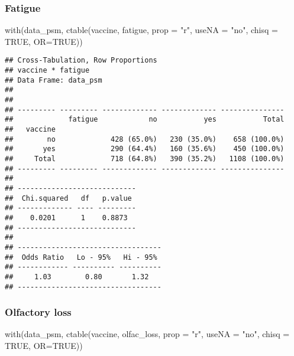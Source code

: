 \documentclass[
]{article}
\newenvironment{Shaded}{\begin{snugshade}}{\end{snugshade}}
\newcommand{\AttributeTok}[1]{\textcolor[rgb]{0.77,0.63,0.00}{#1}}
\newcommand{\ConstantTok}[1]{\textcolor[rgb]{0.00,0.00,0.00}{#1}}
\newcommand{\FunctionTok}[1]{\textcolor[rgb]{0.00,0.00,0.00}{#1}}
\newcommand{\NormalTok}[1]{#1}
\newcommand{\StringTok}[1]{\textcolor[rgb]{0.31,0.60,0.02}{#1}}
\begin{document}
\hypertarget{fatigue-1}{%
\subsubsection{Fatigue}\label{fatigue-1}}

\begin{Shaded}
\begin{Highlighting}[]
\FunctionTok{with}\NormalTok{(data\_psm, }\FunctionTok{ctable}\NormalTok{(vaccine, fatigue, }\AttributeTok{prop =} \StringTok{"r"}\NormalTok{, }\AttributeTok{useNA =} \StringTok{"no"}\NormalTok{, }\AttributeTok{chisq =} \ConstantTok{TRUE}\NormalTok{, }\AttributeTok{OR=}\ConstantTok{TRUE}\NormalTok{))}
\end{Highlighting}
\end{Shaded}

\begin{verbatim}
## Cross-Tabulation, Row Proportions  
## vaccine * fatigue  
## Data Frame: data_psm  
## 
## 
## --------- --------- ------------- ------------- ---------------
##             fatigue            no           yes           Total
##   vaccine                                                      
##        no             428 (65.0%)   230 (35.0%)    658 (100.0%)
##       yes             290 (64.4%)   160 (35.6%)    450 (100.0%)
##     Total             718 (64.8%)   390 (35.2%)   1108 (100.0%)
## --------- --------- ------------- ------------- ---------------
## 
## ----------------------------
##  Chi.squared   df   p.value 
## ------------- ---- ---------
##    0.0201      1    0.8873  
## ----------------------------
## 
## ----------------------------------
##  Odds Ratio   Lo - 95%   Hi - 95% 
## ------------ ---------- ----------
##     1.03        0.80       1.32   
## ----------------------------------
\end{verbatim}

\hypertarget{olfactory-loss-1}{%
\subsubsection{Olfactory loss}\label{olfactory-loss-1}}

\begin{Shaded}
\begin{Highlighting}[]
\FunctionTok{with}\NormalTok{(data\_psm, }\FunctionTok{ctable}\NormalTok{(vaccine, olfac\_loss, }\AttributeTok{prop =} \StringTok{"r"}\NormalTok{, }\AttributeTok{useNA =} \StringTok{"no"}\NormalTok{, }\AttributeTok{chisq =} \ConstantTok{TRUE}\NormalTok{, }\AttributeTok{OR=}\ConstantTok{TRUE}\NormalTok{))}
\end{Highlighting}
\end{Shaded}
\end{document}
